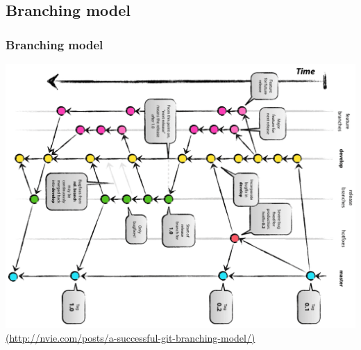 \documentclass[t,11pt]{beamer}
\begin{document}
\subsection{Branching model}
\begin{frame}
        \frametitle{Branching model}
        \centering
        \includegraphics[width=\linewidth,height=0.8\textheight,keepaspectratio]{./img/branching_model}
        \newline
        \href{http://nvie.com/posts/a-successful-git-branching-model/}{{\tiny (http://nvie.com/posts/a-successful-git-branching-model/)}}
\end{frame}
\end{document}
